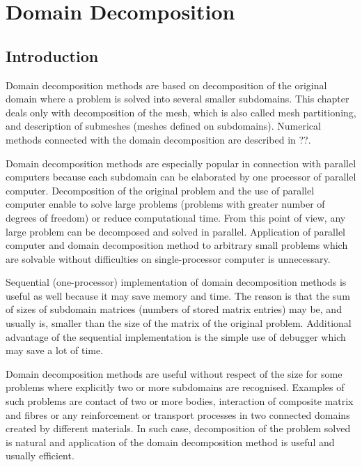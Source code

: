 \chapter{Domain Decomposition}

\section{Introduction}

Domain decomposition methods are based on decomposition of the original domain
where a problem is solved into several smaller subdomains. This chapter deals
only with decomposition of the mesh, which is also called mesh partitioning,
and description of submeshes (meshes defined on subdomains).
Numerical methods connected with the domain decomposition are described in ??.

Domain decomposition methods are especially popular in connection with
parallel computers because each subdomain can be elaborated by one processor
of parallel  computer. Decomposition of the original
problem and the use of parallel computer enable to solve large problems
(problems with greater number of degrees of freedom) or reduce computational
time. From this point of view, any large problem can be decomposed and solved
in parallel. Application of parallel computer and domain decomposition method
to arbitrary small problems which are solvable without difficulties on
single-processor computer is unnecessary.

Sequential (one-processor) implementation of domain decomposition methods
is useful as well because it may save memory and time. The reason is that
the sum of sizes of subdomain matrices (numbers of stored matrix entries)
may be, and usually is, smaller than the size of the matrix of the original
problem. Additional advantage of the sequential implementation is the simple
use of debugger which may save a lot of time.

Domain decomposition methods are useful without respect of the size for some
problems where explicitly two or more subdomains are recognised. Examples of
such problems are  contact
of two or more bodies, interaction of composite
matrix 
and fibres or any reinforcement or transport 
processes 
in two connected domains created by different materials. In such case,
decomposition of the problem solved is natural and application of the
domain decomposition method is useful and usually efficient.


